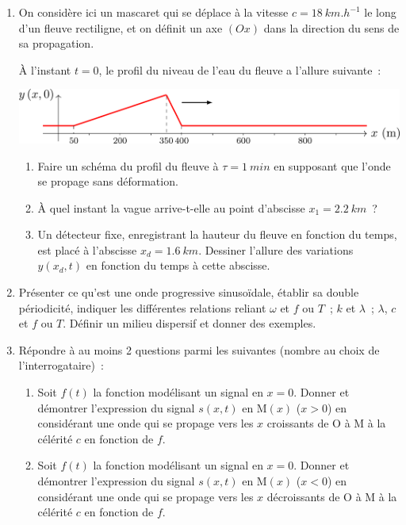 \documentclass[a4paper, 12pt, final, garamond]{book}
\begin{document}
\begin{enumerate}[resume]
	\item On considère ici un mascaret qui se déplace à la vitesse $c =
		      \SI{18}{km.h^{-1}}$ le long d'un fleuve rectiligne, et on définit un axe
	      $(Ox)$ dans la direction du sens de sa propagation.

	      À l'instant $t=0$, le profil du niveau de l'eau du fleuve a l'allure
	      suivante~:
	      \begin{center}
		      \includegraphics[width=0.8\linewidth]{rep_spa-masc_a}
	      \end{center}
	      \begin{enumerate}[label=\sqenumi]
		      \item Faire un schéma du profil du fleuve à $\tau = \SI{1}{min}$ en
		            supposant que l'onde se propage sans déformation.
		      \item À quel instant la vague arrive-t-elle au point d'abscisse $x_1 =
			            \SI{2.2}{km}$~?
		      \item Un détecteur fixe, enregistrant la hauteur du fleuve en fonction
		            du temps, est placé à l'abscisse $x_d = \SI{1.6}{km}$. Dessiner
		            l'allure des variations $y(x_d,t)$ en fonction du temps à cette
		            abscisse.
	      \end{enumerate}
	\item Présenter ce qu'est une onde progressive sinusoïdale, établir sa
	      double périodicité, indiquer les différentes relations reliant $\omega$
	      et $f$ ou $T$~; $k$ et $\lambda$~; $\lambda$, $c$ et $f$ ou $T$. Définir
	      un milieu dispersif et donner des exemples.
	\item Répondre à au moins 2 questions parmi les suivantes (nombre au choix
	      de l'interrogataire)~:
	      \begin{enumerate}
		      \item Soit $f(t)$ la fonction modélisant un signal en $x=0$. Donner
		            et démontrer l'expression du signal $s(x,t)$ en M$(x)$ ($x>0$) en
		            considérant une onde qui se propage vers les $x$ croissants de O à
		            M à la célérité $c$ en fonction de $f$.

		      \item Soit $f(t)$ la fonction modélisant un signal en $x=0$. Donner
		            et démontrer l'expression du signal $s (x,t)$ en M$(x)$ ($x<0$) en
		            considérant une onde qui se propage vers les $x$ décroissants de O
		            à M à la célérité $c$ en fonction de $f$.


\end{enumerate}
\end{enumerate}
\end{document}
